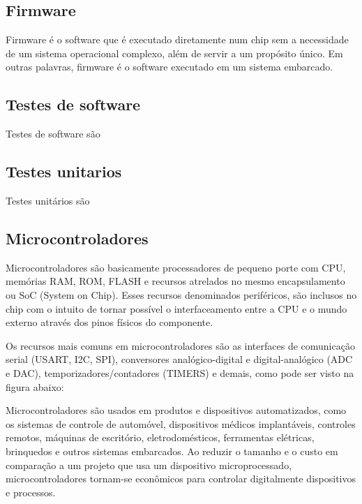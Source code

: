\documentclass[times, twoside, watermark]{artigo}
\begin{document}
\subsection{Firmware}
Firmware é o software que é executado diretamente num chip sem a necessidade de um sistema operacional complexo, além de servir a um propósito único. Em outras palavras, firmware é o software executado em um sistema embarcado. 


\subsection{Testes de software}
Testes de software são

\subsection{Testes unitarios}
Testes unitários são



\subsection{Microcontroladores}
Microcontroladores são basicamente processadores de pequeno porte com CPU, memórias RAM, ROM, FLASH e recursos atrelados no mesmo encapsulamento ou SoC (System on Chip)\cite{architecturemicrocontroller}. Esses recursos denominados periféricos, são inclusos no chip com o intuito de tornar possível o interfaceamento entre a CPU e o mundo externo através dos pinos físicos do componente.

Os recursos mais comuns em microcontroladores são as interfaces de comunicação serial (USART, I2C, SPI), conversores analógico-digital e digital-analógico (ADC e DAC), temporizadores/contadores (TIMERS) e demais, como pode ser visto na figura abaixo:


Microcontroladores são usados em produtos e dispositivos automatizados, como os sistemas de controle de automóvel, dispositivos médicos implantáveis, controles remotos, máquinas de escritório, eletrodomésticos, ferramentas elétricas, brinquedos e outros sistemas embarcados. \newline Ao reduzir o tamanho e o custo em comparação a um projeto que usa um dispositivo microprocessado, microcontroladores tornam-se econômicos para controlar digitalmente dispositivos e processos.
\end{document}
